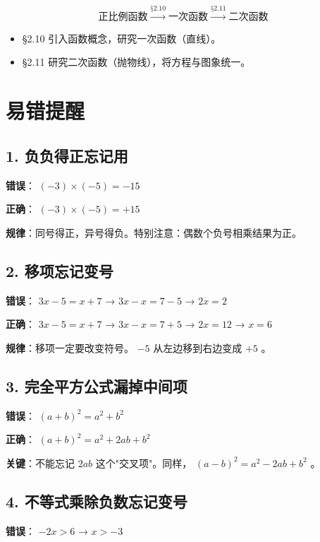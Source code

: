 \[
\text{正比例函数} \xrightarrow{\text{§2.10}} \text{一次函数} \xrightarrow{\text{§2.11}} \text{二次函数}
\]


\begin{itemize}
  \item §2.10 引入函数概念，研究一次函数（直线）。
  \item §2.11 研究二次函数（抛物线），将方程与图象统一。
\end{itemize}


\section*{易错提醒}


\subsection*{1. 负负得正忘记用}


\textbf{错误}： $(-3) \times (-5) = -15$

\textbf{正确}： $(-3) \times (-5) = +15$

\textbf{规律}：同号得正，异号得负。特别注意：偶数个负号相乘结果为正。

\subsection*{2. 移项忘记变号}


\textbf{错误}： $3x - 5 = x + 7$ → $3x - x = 7 - 5$ → $2x = 2$

\textbf{正确}： $3x - 5 = x + 7$ → $3x - x = 7 + 5$ → $2x = 12$ → $x = 6$

\textbf{规律}：移项一定要改变符号。 $-5$ 从左边移到右边变成 $+5$ 。

\subsection*{3. 完全平方公式漏掉中间项}


\textbf{错误}： $(a + b)^2 = a^2 + b^2$

\textbf{正确}： $(a + b)^2 = a^2 + 2ab + b^2$

\textbf{关键}：不能忘记 $2ab$ 这个"交叉项"。同样， $(a - b)^2 = a^2 - 2ab + b^2$ 。

\subsection*{4. 不等式乘除负数忘记变号}


\textbf{错误}： $-2x > 6$ → $x > -3$


